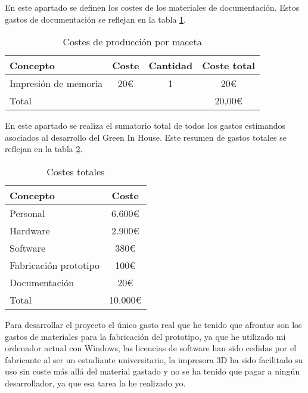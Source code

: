             En este apartado se definen los costes de los materiales de documentación. Estos gastos de documentación se reflejan en la tabla \ref{tab:costes de documentación de desarrollo inicial}.
            \begin{table}[H]
                \centering
                \caption{Costes de producción por maceta}
                \begin{tabular}{|l|c|c|c|}
                    \hline
                    Concepto & Coste & Cantidad & Coste total \\
                    \hline
                    Impresión de memoria & 20€ & 1 & 20€ \\
                    \hline
                    Total & & & 20,00€ \\
                    \end{tabular}
                    \label{tab:costes de documentación de desarrollo inicial}
                \end{table}
            
            En este apartado se realiza el sumatorio total de todos los gastos estimandos asociados al desarrollo del Green In House. Este resumen de gastos totales se reflejan en la tabla \ref{tab:costes totales de desarrollo inicial}.
            \begin{table}[H]
                \centering
                \caption{Costes totales}
                \begin{tabular}{|l|c|}
                    \hline
                    Concepto & Coste \\
                    \hline
                    Personal & 6.600€ \\
                    Hardware & 2.900€ \\
                    Software & 380€ \\
                    Fabricación prototipo & 100€ \\
                    Documentación & 20€ \\
                    \hline
                    Total & 10.000€ \\
                    \hline
                \end{tabular}
                \label{tab:costes totales de desarrollo inicial}
            \end{table}
            Para desarrollar el proyecto el único gasto real que he tenido que afrontar son los gastos de materiales para la fabricación del prototipo, ya que he utilizado mi ordenador actual con Windows, las licencias de software han sido cedidas por el fabricante al ser un estudiante universitario, la impresora 3D ha sido facilitado su uso sin coste más allá del material gastado y no se ha tenido que pagar a ningún desarrollador, ya que esa tarea la he realizado yo.

